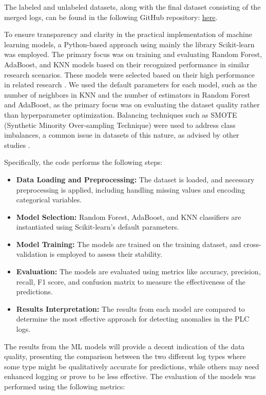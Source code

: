\documentclass[Master,BMR,english]{twbook}
\begin{document}
The labeled and unlabeled datasets, along with the final dataset consisting of the merged logs, can be found in the following GitHub repository: \href{https://github.com/EjubBeg/Master/tree/main/R2_Machine_Learning}{here}.

To ensure transparency and clarity in the practical implementation of machine learning models, a Python-based approach using mainly the library Scikit-learn was employed. The primary focus was on training and evaluating Random Forest, AdaBoost, and KNN models based on their recognized performance in similar research scenarios. These models were selected based on their high performance in related research \cite{nassif_machine_2021}. We used the default parameters for each model, such as the number of neighbors in KNN and the number of estimators in Random Forest and AdaBoost, as the primary focus was on evaluating the dataset quality rather than hyperparameter optimization. Balancing techniques such as SMOTE (Synthetic Minority Over-sampling Technique) were used to address class imbalances, a common issue in datasets of this nature, as advised by other studies \cite{scikit-resamble}. 

Specifically, the code performs the following steps:

\begin{itemize}
    \item \textbf{Data Loading and Preprocessing:} The dataset is loaded, and necessary preprocessing is applied, including handling missing values and encoding categorical variables.
    \item \textbf{Model Selection:} Random Forest, AdaBoost, and KNN classifiers are instantiated using Scikit-learn's default parameters.
    \item \textbf{Model Training:} The models are trained on the training dataset, and cross-validation is employed to assess their stability.
    \item \textbf{Evaluation:} The models are evaluated using metrics like accuracy, precision, recall, F1 score, and confusion matrix to measure the effectiveness of the predictions.
    \item \textbf{Results Interpretation:} The results from each model are compared to determine the most effective approach for detecting anomalies in the PLC logs.
\end{itemize}

The results from the ML models will provide a decent indication of the data quality, presenting the comparison between the two different log types where some type might be qualitatively accurate for predictions, while others may need enhanced logging or prove to be less effective. The evaluation of the models was performed using the following metrics:
\end{document}
